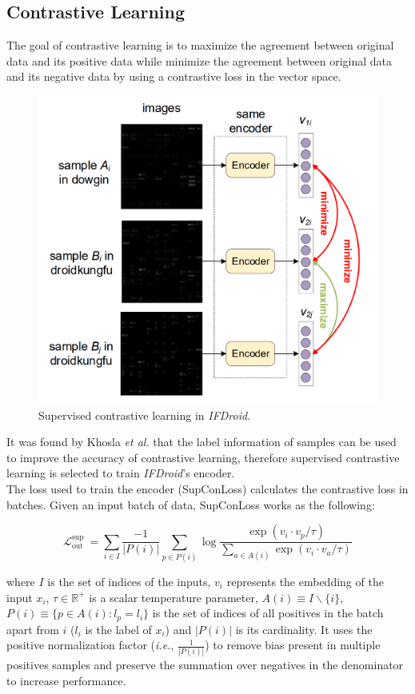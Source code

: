 \subsection{Contrastive Learning}
The goal of contrastive learning is to maximize the agreement between original data and its positive data while minimize the agreement between original data and its negative data by using a contrastive loss in the vector space.

\begin{figure}[H]
    \centering
    \includegraphics[width=0.6\linewidth]{Images/Encoder.png}
    \caption{Supervised contrastive learning in \textit{IFDroid}.}
    \label{fig:Encoder}
\end{figure}

\noindent It was found by Khosla \textit{et al.} \cite{khosla2020supervised} that the label information of samples can be used to improve the accuracy of contrastive learning, therefore supervised contrastive learning is selected to train \textit{IFDroid}'s encoder. \\
The loss used to train the encoder (SupConLoss) calculates the contrastive loss in batches. Given an input batch of data, SupConLoss works as the following: 

\begin{equation}
    \mathcal{L}_{\text {out }}^{\text {sup }}=\sum_{i \in I} \frac{-1}{|P(i)|} \sum_{p\in P(i)} \log \frac{\exp \left(v_{i} \cdot v_{p} / \tau\right)}{\sum_{a\in A(i)} \exp \left(v_{i} \cdot v_{a} / \tau\right)}
    \label{eq:SupConLoss}
\end{equation}

\vspace{1.5pt}
\noindent where $I$ is the set of indices of the inputs, $v_{i}$ represents the embedding of the input $x_{i}$, $\tau\in\mathbb{R}^{+}$ is a scalar temperature parameter, $A(i)\equiv I\backslash\{i\}$, $P(i)\equiv \{p\in A(i) : l_{p} = l_{i}\}$ is the set of indices of all positives in the batch apart from $i$ ($l_{i}$ is the label of $x_{i}$) and $|P(i)|$ is its cardinality. It uses the positive normalization factor (\textit{i.e.}, $\frac{1}{|P(i)|}$)
to remove bias present in multiple positives samples and preserve the summation over negatives in the denominator to increase performance.

